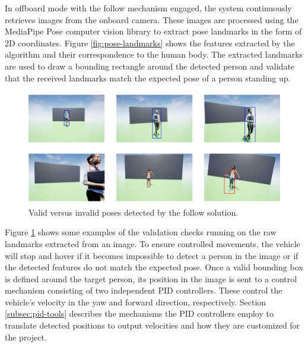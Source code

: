 In offboard mode with the follow mechanism engaged, the system continuously retrieves images from the onboard camera. These images are processed using the MediaPipe Pose \cite{mp-pose-paper} computer vision library to extract pose landmarks in the form of 2D coordinates. 
Figure \ref{fig:pose-landmarks} shows the features extracted by the algorithm and their correspondence to the human body.
The extracted landmarks are used to draw a bounding rectangle around the detected person and validate that the received landmarks match the expected pose of a person standing up.

\begin{figure}
  \centering
  \includegraphics[width=\textwidth, keepaspectratio]{img/pose-validation.jpg}
  \caption{Valid versus invalid poses detected by the follow solution.}
  \label{fig:pose-validation}
\end{figure}

Figure \ref{fig:pose-validation} shows some examples of the validation checks running on the raw landmarks extracted from an image.
To ensure controlled movements, the vehicle will stop and hover if it becomes impossible to detect a person in the image or if the detected features do not match the expected pose. Once a valid bounding box is defined around the target person, its position in the image is sent to a control mechanism consisting of two independent PID controllers. These control the vehicle's velocity in the yaw and forward direction, respectively. Section \ref{subsec:pid-tools} describes the mechanisms the PID controllers employ to translate detected positions to output velocities and how they are customized for the project.

